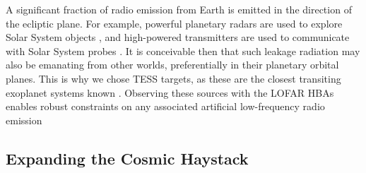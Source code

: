 
A significant fraction of radio emission from Earth is emitted in the direction of the ecliptic plane. For example, powerful planetary radars are used to explore Solar System objects \citep{Siemion_KEPLER_ApJ}, and high-powered transmitters are used to communicate with Solar System probes \citep{Enriquez2017ApJ}. It is conceivable then that such leakage radiation may also be emanating from other worlds, preferentially in their planetary orbital planes. This is why we chose TESS targets, as these are the closest transiting exoplanet systems known \citep{Kepler_Mission_Design_2010,TESS2015}. Observing these sources with the LOFAR HBAs enables robust constraints on any associated artificial low-frequency radio emission

\subsection{Expanding the Cosmic Haystack}

